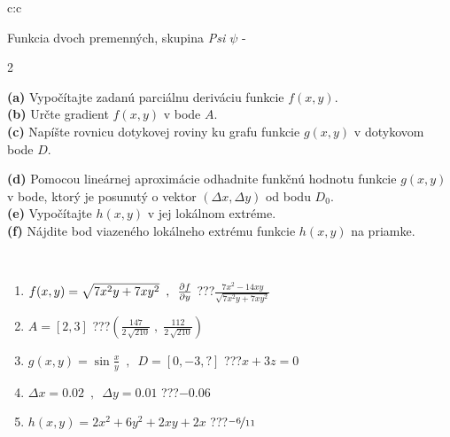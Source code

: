 \documentclass[10pt]{report}
\begin{document}
\begin{tabular}{c:c}
\begin{minipage}[c][104.5mm][t]{0.5\linewidth}
\begin{center}
\vspace{7mm}
{\huge \LARGE Funkcia dvoch premenných, skupina \textit{Psi $\psi$} -}\\[5mm]
\begin{minipage}{0.95\linewidth}
\begin{center}
{\small \begin{multicols}{2} \raggedright
\textbf{(a)} Vypočítajte zadanú parciálnu deriváciu funkcie \(f(x,y)\). \\[1mm]
\textbf{(b)} Určte gradient \(f(x,y)\) v bode \(A\). \\[1mm]
\textbf{(c)} Napíšte rovnicu dotykovej roviny ku grafu funkcie \(g(x,y)\) v dotykovom bode \(D\). \par \columnbreak
\textbf{(d)} Pomocou lineárnej aproximácie odhadnite funkčnú hodnotu funkcie \(g(x,y)\) v bode, ktorý je posunutý o vektor \((\Delta x, \Delta y)\) od bodu \(D_0\). \\[1mm]
\textbf{(e)} Vypočítajte \(h(x,y)\) v jej lokálnom extréme. \\[1mm]
\textbf{(f)} Nájdite bod viazeného lokálneho extrému funkcie \(h(x,y)\) na priamke. \\[1mm]
\end{multicols}
}
\end{center}
\end{minipage}
\\[4mm]
\begin{minipage}{0.79\linewidth}
\begin{center}
\begin{varwidth}{\linewidth}
\begin{enumerate}
\normalsizerr
\item $f(x,y) = \sqrt{7x^2y + 7xy^2}\enspace , \enspace \pdv{f}{y}$\quad \dotfill\; ???\;\dotfill \quad $\frac{7x^2-14xy}{\sqrt{7x^2y+7xy^2}}$
\item $A = [2, 3]$\quad \dotfill\; ???\;\dotfill \quad $\left( \frac{147}{2\,\sqrt{210}} \;,\; \frac{112}{2\,\sqrt{210}} \right)$
\item $g(x,y) = \sin\frac{x}{y} \enspace , \enspace D = [0, -3, ?]$\quad \dotfill\; ???\;\dotfill \quad $x+3z=0$
\item $\Delta x = {0.02} \enspace,\enspace \Delta y = {0.01}$\quad \dotfill\; ???\;\dotfill \quad $-0.06$
\item $h(x,y) = 2x^2+6y^2+2xy+2x$\quad \dotfill\; ???\;\dotfill \quad $\nicefrac{-6}{11}$

\end{enumerate}
\end{varwidth}
\end{center}
\end{minipage}
\end{center}
\end{minipage}
\end{tabular}
\end{document}
